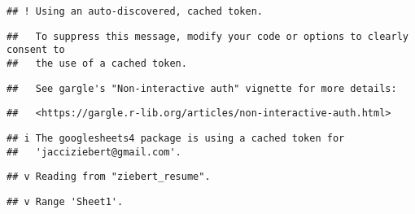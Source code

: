 \documentclass[
]{article}
\begin{document}
\begin{verbatim}
## ! Using an auto-discovered, cached token.
\end{verbatim}

\begin{verbatim}
##   To suppress this message, modify your code or options to clearly consent to
##   the use of a cached token.
\end{verbatim}

\begin{verbatim}
##   See gargle's "Non-interactive auth" vignette for more details:
\end{verbatim}

\begin{verbatim}
##   <https://gargle.r-lib.org/articles/non-interactive-auth.html>
\end{verbatim}

\begin{verbatim}
## i The googlesheets4 package is using a cached token for
##   'jacciziebert@gmail.com'.
\end{verbatim}

\begin{verbatim}
## v Reading from "ziebert_resume".
\end{verbatim}

\begin{verbatim}
## v Range 'Sheet1'.
\end{verbatim}
\end{document}
